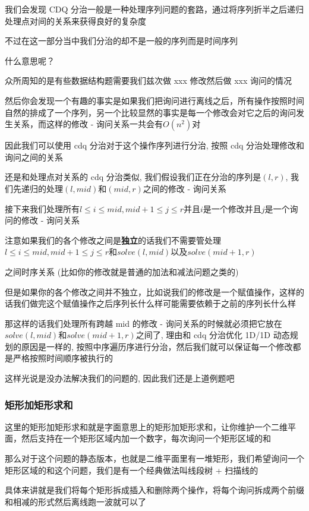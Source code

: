 我们会发现 CDQ 分治一般是一种处理序列问题的套路，通过将序列折半之后递归处理点对间的关系来获得良好的复杂度

不过在这一部分当中我们分治的却不是一般的序列而是时间序列

什么意思呢？

众所周知的是有些数据结构题需要我们兹次做 xxx 修改然后做 xxx 询问的情况

然后你会发现一个有趣的事实是如果我们把询问进行离线之后，所有操作按照时间自然的排成了一个序列，另一个比较显然的事实是每一个修改会对它之后的询问发生关系，而这样的修改 - 询问关系一共会有$O(n^2)$对

因此我们可以使用 cdq 分治对于这个操作序列进行分治, 按照 cdq 分治处理修改和询问之间的关系

还是和处理点对关系的 cdq 分治类似, 我们假设我们正在分治的序列是$(l,r)$, 我们先递归的处理$(l,mid)$和$(mid,r)$之间的修改 - 询问关系

接下来我们处理所有$l \leq i \leq mid,mid+1 \leq j \leq r$并且$i$是一个修改并且$j$是一个询问的修改 - 询问关系

注意如果我们的各个修改之间是\textbf{独立}的话我们不需要管处理$l \leq i \leq mid,mid+1 \leq j \leq r$和$solve(l,mid)$以及$solve(mid+1,r)$

之间时序关系 (比如你的修改就是普通的加法和减法问题之类的)

但是如果你的各个修改之间并不独立，比如说我们的修改是一个赋值操作，这样的话我们做完这个赋值操作之后序列长什么样可能需要依赖于之前的序列长什么样

那这样的话我们处理所有跨越 mid 的修改 - 询问关系的时候就必须把它放在$solve(l,mid)$和$solve(mid+1,r)$之间了, 理由和 cdq 分治优化 1D/1D 动态规划的原因是一样的, 按照中序遍历序进行分治，然后我们就可以保证每一个修改都是严格按照时间顺序被执行的

这样光说是没办法解决我们的问题的, 因此我们还是上道例题吧

\subsubsection{矩形加矩形求和}

这里的矩形加矩形求和就是字面意思上的矩形加矩形求和，让你维护一个二维平面，然后支持在一个矩形区域内加一个数字，每次询问一个矩形区域的和

那么对于这个问题的静态版本，也就是二维平面里有一堆矩形，我们希望询问一个矩形区域的和这个问题，我们是有一个经典做法叫线段树 + 扫描线的

具体来讲就是我们将每个矩形拆成插入和删除两个操作，将每个询问拆成两个前缀和相减的形式然后离线跑一波就可以了

